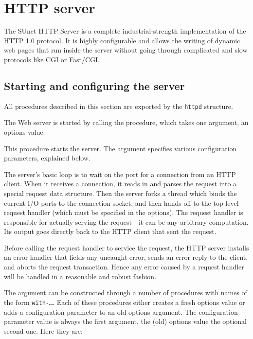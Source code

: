 \chapter{HTTP server}\label{cha:httpd}
%
The SUnet HTTP Server is a complete industrial-strength implementation
of the HTTP 1.0 protocol.  It is highly configurable and allows the writing
of dynamic web pages that run inside the server without going through
complicated and slow protocols like CGI or Fast/CGI.
       
\section{Starting and configuring the server}

All procedures described in this section are exported by the
\texttt{httpd} structure.

The Web server is started by calling the  procedure, which takes
one argument, an options value:

\begin{desc}
  This procedure starts the server. The  argument
  specifies various configuration parameters, explained below.
  
  The server's basic loop is to wait on the port for a connection from
  an HTTP client. When it receives a connection, it reads in and
  parses the request into a special request data structure.  Then the
  server forks a thread which binds the current I/O ports to the
  connection socket, and then hands off to the top-level
  request handler (which must be specified in the options). The
  request handler is responsible for actually serving
  the request---it can be any arbitrary computation.  Its output goes
  directly back to the HTTP client that sent the request.
   
  Before calling the request handler to service the request, the HTTP
  server installs an error handler that fields any uncaught error,
  sends an error reply to the client, and aborts the request
  transaction.  Hence any error caused by a request handler will be
  handled in a reasonable and robust fashion.
\end{desc}
%
The  argument can be constructed through a number of procedures
with names of the form \texttt{with-\ldots}.  Each of these procedures
either creates a fresh options value or adds a configuration parameter
to an old options argument.  The configuration parameter value is
always the first argument, the (old) options value the optional second
one.  Here they are:

